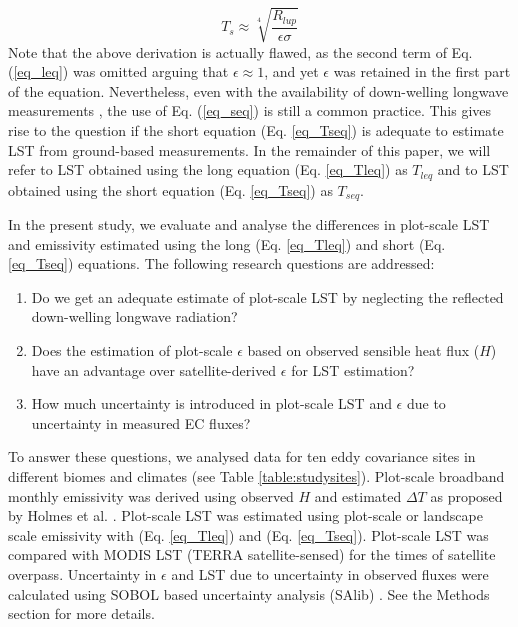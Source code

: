 \documentclass[fleqn,10pt]{wlscirep}
\begin{document}
\begin{equation}\label{eq_Tseq}
T_{s} \approx \sqrt[4]{\frac{R_{lup}}{\epsilon \sigma}}
\end{equation} 
Note that the above derivation is actually flawed, as the second term of Eq. (\ref{eq_leq}) was omitted arguing that $\epsilon\approx 1$, and yet $\epsilon$ was retained in the first part of the equation. Nevertheless, even with the availability of down-welling longwave measurements \cite{stephens1995review}, the use of Eq. (\ref{eq_seq}) is still a common practice\cite{crago_use_2014-2,mallick2018bridging}. This gives rise to the question if the short equation (Eq. \ref{eq_Tseq}) is adequate to estimate LST from ground-based measurements. In the remainder of this paper, we will refer to LST obtained using the long equation (Eq. \ref{eq_Tleq}) as $T_{leq}$ and to LST obtained using the short equation (Eq. \ref{eq_Tseq}) as $T_{seq}$.


In the present study, we evaluate and analyse the differences in plot-scale LST and emissivity estimated using the long (Eq. \ref{eq_Tleq}) and short (Eq. \ref{eq_Tseq}) equations. 
The following research questions are addressed:
\begin{enumerate}
	\item Do we get an adequate estimate of plot-scale LST by neglecting the reflected down-welling longwave radiation?
	\item Does the estimation of plot-scale $\epsilon$ based on observed sensible heat flux ($H$) have an advantage over satellite-derived $\epsilon$ for LST estimation?
    \item How much uncertainty is introduced in plot-scale LST and $\epsilon$ due to uncertainty in measured EC fluxes?
    
\end{enumerate}    
To answer these questions, we analysed data for ten eddy covariance sites in different biomes and climates (see Table \ref{table:studysites}).
Plot-scale broadband monthly emissivity was derived using observed $H$ and estimated $\Delta T$ as proposed by Holmes et al. \cite{holmes_land_2009}.  Plot-scale LST was estimated using plot-scale or landscape scale emissivity with (Eq. \ref{eq_Tleq}) and (Eq. \ref{eq_Tseq}). Plot-scale LST was compared with MODIS LST (TERRA satellite-sensed) for the times of satellite overpass. Uncertainty in $\epsilon$ and LST due to uncertainty in observed fluxes were calculated using SOBOL based uncertainty analysis (SAlib) \cite{rosolem2012fully}. %
See the Methods section for more details.
\end{document}
